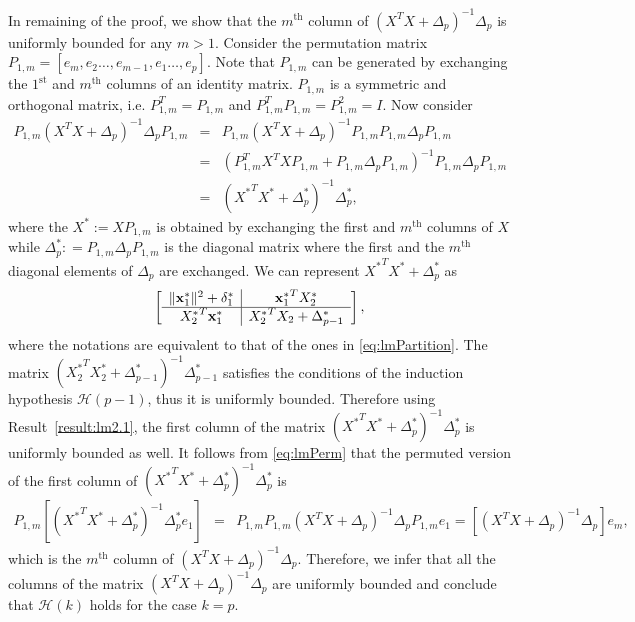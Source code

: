 \documentclass[noinfoline,11pt]{imsart}
\numberwithin{equation}{section}
\theoremstyle{plain}
\newcommand{\lmDelta}{\Delta}
\newcommand{\lmdelta}{\delta}
\newcommand{\lmX}{X}
\newcommand{\norm}[1]{ \Vert #1 \Vert }
\newcommand{\lmA}{A}
\newcommand{\lmxbf}{{\bf x}}
\begin{document}
  In remaining of the proof, we show that  the $m^{\text{th}}$ column of  $(\lmX^T\lmX+\lmDelta_p)^{-1}\lmDelta_p$ is uniformly bounded for any  $m>1$.  Consider the permutation matrix $P_{1, m}=\left[ e_m,e_2 \ldots ,e_{m-1},e_{1} \ldots, e_p \right]$.  Note that $P_{1,m}$ can be generated by exchanging the $1^{\text{st}}$ and $m^{\text{th}}$ columns of an identity matrix.   $P_{1, m}$ is a symmetric and orthogonal matrix, i.e. $P_{1,m}^T=P_{1,m}$ and $P_{1,m}^TP_{1,m}=P_{1,m}^2=I$. Now consider 
\begin{eqnarray}\label{eq:lmPerm}
P_{1,m} (\lmX^T\lmX+\lmDelta_p)^{-1}\lmDelta_p P_{1,m}  
& = &  P_{1,m}(\lmX^T\lmX+\lmDelta_p)^{-1} P_{1,m} P_{1,m}\lmDelta_p P_{1,m}\nonumber\\
& = &  (P_{1,m}^T \lmX^T\lmX P_{1,m} +P_{1,m} \lmDelta_p P_{1,m} )^{-1} P_{1,m}\lmDelta_p P_{1,m}\nonumber\\
& = &  ( {\lmX^{*}}^T \lmX^{*}  + \lmDelta_p^{*} )^{-1} \lmDelta_p^{*},
\end{eqnarray}
where the $ \lmX^{*}:=\lmX P_{1,m} $ is obtained by exchanging the first and $m^{\text{th}}$ columns of $\lmX$  while $ \lmDelta_p^{*}: =P_{1,m}\lmDelta_p P_{1,m}$ is the diagonal matrix where the first and the $m^{\text{th}}$ diagonal elements of $\lmDelta_p$ are exchanged.  We can represent ${\lmX^*}^T\lmX^*+\lmDelta^*_p$ as
$$\left[
\begin{array}{c|c}
\norm{\lmxbf^*_{1}}^2+\lmdelta^*_1 &     {\lmxbf^*_1}^T\lmX^{*}_2 \\ \hline
  {\lmX_2^*}^T\lmxbf^*_1 &{\lmX^*_2}^T\lmX_2+\lmDelta^*_{p-1}
\end{array}\right], $$
\noindent
where the notations are equivalent to that of the ones in \ref{eq:lmPartition}. The matrix $({\lmX^*_{2}}^T\lmX^*_{2}+\lmDelta^*_{p-1})^{-1}\lmDelta^*_{p-1}$  satisfies the conditions of the induction hypothesis $\mathcal{H}{(p-1)}$, thus  it is uniformly bounded.  Therefore using Result~\ref{result:lm2.1}, the first column of the matrix $({\lmX^*}^T\lmX^*+\lmDelta^*_p)^{-1}\lmDelta^*_p $ is uniformly bounded as well.
 It follows from \ref{eq:lmPerm} that the permuted version of the  first column of  $( {\lmX^{*}}^T \lmX^{*}  + \lmDelta_p^{*} )^{-1} \lmDelta_p^{*} $ is
\begin{eqnarray}
P_{1,m}\left[( {\lmX^{*}}^T \lmX^{*}  + \lmDelta_p^{*} )^{-1} \lmDelta_p^{*} e_1 \right]
& =&  P_{1,m}P_{1,m} (\lmX^T\lmX+\lmDelta_p)^{-1}\lmDelta_p P_{1,m}   e_1 = \left[  (\lmX^T\lmX+\lmDelta_p)^{-1}\lmDelta_p \right]  e_m, \nonumber
\end{eqnarray}
 which is the $m^{\text{th}}$ column of $ (\lmX^T\lmX+\lmDelta_p)^{-1}\lmDelta_p$. 
Therefore, we infer that  all the columns of the matrix  $(\lmX^T\lmX+\lmDelta_p)^{-1}\lmDelta_p$ are uniformly bounded and conclude that  $\mathcal{H}(k)$ holds for the case $k=p$.
 
\end{document}
